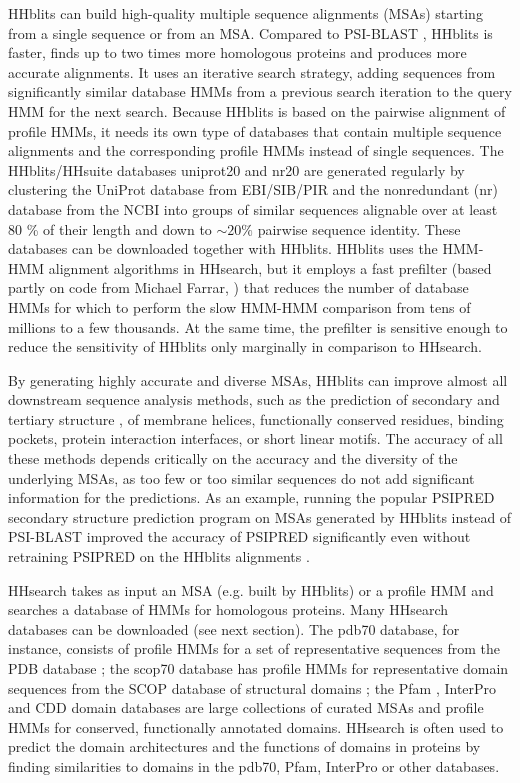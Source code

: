\documentclass[11pt,a4paper]{article}
\begin{document}
HHblits can build high-quality multiple sequence alignments (MSAs) starting from a single sequence or from an MSA. Compared to PSI-BLAST \cite{Altschul:1997}, HHblits is faster, finds up to two times more homologous proteins and produces more accurate alignments. It uses an iterative search strategy, adding sequences from significantly similar database HMMs from a previous search iteration to the query HMM for the next search. Because HHblits is based on the pairwise alignment of profile HMMs, it needs its own type of databases that contain multiple sequence alignments and the corresponding profile HMMs instead of single sequences. The HHblits/HHsuite databases uniprot20 and nr20 are generated regularly by clustering the UniProt database \cite{uniprot:2010} from EBI/SIB/PIR and the nonredundant (nr) database from the NCBI into groups of similar sequences alignable over at least 80 \% of their length and down to $\sim 20 \%$ pairwise sequence identity. These databases can be downloaded together with HHblits. HHblits uses the HMM-HMM alignment algorithms in HHsearch, but it employs a fast prefilter (based partly on code from Michael Farrar, \cite{Farrar:2007}) that reduces the number of database HMMs for which to perform the slow HMM-HMM comparison from tens of millions to a few thousands. At the same time, the prefilter is sensitive enough to reduce the sensitivity of HHblits only marginally in comparison to HHsearch. 

By generating highly accurate and diverse MSAs, HHblits can improve almost all downstream sequence analysis methods, such as the prediction of secondary and tertiary structure \cite{Jones:1999, Marks:2011}, of membrane helices, functionally conserved residues, binding pockets, protein interaction interfaces, or short linear motifs. The accuracy of all these methods depends critically on the accuracy and the diversity of the underlying MSAs, as too few or too similar sequences do not add significant information for the predictions. As an example, running the popular PSIPRED secondary structure prediction program \cite{Jones:1999} on MSAs generated by HHblits instead of PSI-BLAST improved the accuracy of PSIPRED significantly even without retraining PSIPRED on the HHblits alignments \cite{Remmert:2011}. 

HHsearch takes as input an MSA (e.g. built by HHblits) or a profile HMM and searches a database of HMMs for homologous proteins. Many HHsearch databases can be downloaded (see next section). The pdb70 database, for instance, consists of profile HMMs for a set of representative sequences from the PDB database \cite{PDB:2004}; the scop70 database has profile HMMs for representative domain sequences from the SCOP database of structural domains \cite{SCOP:2000}; the Pfam \cite{Finn:2010}, InterPro \cite{Hunter:2009} and CDD \cite{Marchler:2011} domain databases are large collections of curated MSAs and profile HMMs for conserved, functionally annotated domains. HHsearch is often used to predict the domain architectures and the functions of domains in proteins by finding similarities to domains in the pdb70, Pfam, InterPro or other databases. 
\end{document}
